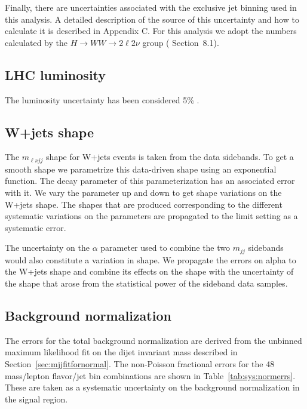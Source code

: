 Finally, there are uncertainties associated with the exclusive jet
binning used in this analysis. A detailed description of the source of
this uncertainty and how to calculate it is described in
\cite{cite:combine} Appendix C.  For this analysis we adopt the
numbers calculated by the $H\rightarrow WW\rightarrow 2\ell 2\nu$
group (\cite{cite:higgs2l2nu} Section~8.1).

\subsection{LHC luminosity}

The luminosity uncertainty has been considered 5\% \cite{lumiPAS}.

\subsection{W+jets shape}
\label{sec:syst_mlvjj}
The $m_{\ell\nu jj}$ shape for W+jets events is taken from the data
sidebands. To get a smooth shape we parametrize this data-driven
shape using an exponential function. The decay parameter of this
parameterization has an associated error with it. We vary the
parameter up and down to get shape variations on the W+jets shape.
The shapes that are produced corresponding to the different systematic
variations on the parameters are propagated to the limit setting as a
systematic error.

The uncertainty on the $\alpha$ parameter used to combine the two
$m_{jj}$ sidebands would also constitute a variation in shape.  We
propagate the errors on alpha to the W+jets shape and combine its
effects on the shape with the uncertainty of the shape that arose
from the statistical power of the sideband data samples.

\subsection{Background normalization}
\label{sec:syst_mjj}

The errors for the total background normalization are derived from the
unbinned maximum likelihood fit on the dijet invariant mass described
in Section~\ref{sec:mjjfitfornormal}. The non-Poisson fractional errors for
the 48 mass/lepton flavor/jet bin combinations are shown in
Table~\ref{tab:sys:normerrs}.  These are taken as a systematic
uncertainty on the background normalization in the signal region.

